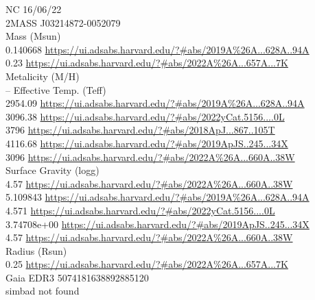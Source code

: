 NC 16/06/22\\
2MASS J03214872-0052079 \\
Mass (Msun)\\
0.140668 \url{https://ui.adsabs.harvard.edu/?#abs/2019A%26A...628A..94A}\\
0.23 \url{https://ui.adsabs.harvard.edu/?#abs/2022A%26A...657A...7K}\\
Metalicity (M/H)\\
--
Effective Temp. (Teff)\\
2954.09 \url{https://ui.adsabs.harvard.edu/?#abs/2019A%26A...628A..94A}\\
3096.38 \url{https://ui.adsabs.harvard.edu/?#abs/2022yCat.5156....0L}\\
3796 \url{https://ui.adsabs.harvard.edu/?#abs/2018ApJ...867..105T}\\
4116.68 \url{https://ui.adsabs.harvard.edu/?#abs/2019ApJS..245...34X}\\
3096 \url{https://ui.adsabs.harvard.edu/?#abs/2022A%26A...660A..38W}\\
Surface Gravity (logg)\\
4.57 \url{https://ui.adsabs.harvard.edu/?#abs/2022A%26A...660A..38W}\\
5.109843 \url{https://ui.adsabs.harvard.edu/?#abs/2019A%26A...628A..94A}\\
4.571 \url{https://ui.adsabs.harvard.edu/?#abs/2022yCat.5156....0L}\\
3.74708e+00	\url{https://ui.adsabs.harvard.edu/?#abs/2019ApJS..245...34X}\\
4.57 \url{https://ui.adsabs.harvard.edu/?#abs/2022A%26A...660A..38W}\\
Radius (Rsun)\\
0.25 \url{https://ui.adsabs.harvard.edu/?#abs/2022A%26A...657A...7K}\\

Gaia EDR3 5074181638892885120\\
simbad not found\\